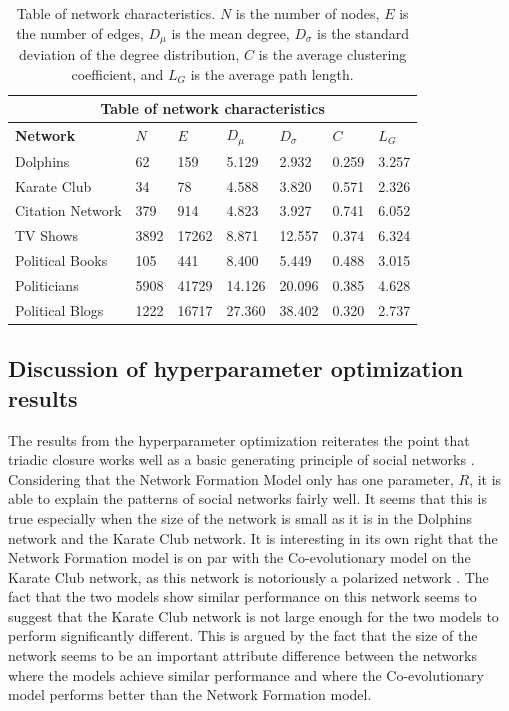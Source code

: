 \documentclass{article}
\begin{document}
\begin{table}[H]
    \begin{center}
        
    \begin{tabular}{ |p{3cm}||p{1.5cm}|p{1.5cm}|p{1.5cm}|p{1.5cm}|p{1.5cm}|p{1.5cm}|}
        \hline
        \multicolumn{7}{|c|}{Table of network characteristics} \\
        \hline
        \bf{Network} & $N$ & $E$ & $D_{\mu}$ & $D_{\sigma}$ & $C$ & $L_G$\\
        \hline
        Dolphins   & 62    &159&   5.129&   2.932 &   0.259 & 3.257\\
        Karate Club &34	&78	&4.588&	3.820&	0.571&	2.326\\
        Citation Network & 379 &	914	& 4.823	& 3.927 & 0.741 & 6.052 \\
        TV Shows & 3892 & 17262&8.871 & 12.557 & 0.374&6.324\\
        Political Books &105 &	441	& 8.400 &	5.449 &	0.488 &	3.015\\
        Politicians&  5908 &41729 & 14.126 & 20.096 &	0.385 & 4.628\\
        Political Blogs &	1222 & 16717 & 27.360 & 38.402 & 0.320 & 2.737\\
        \hline
    \end{tabular}
    \end{center}
    \caption{Table of network characteristics. $N$ is the number of nodes, $E$ is the number of edges, $D_{\mu}$ is the mean degree, $D_{\sigma}$ is the standard deviation of the degree distribution, $C$ is the average clustering coefficient, and $L_G$ is the average path length. }
    \label{table:characteristics}
    \end{table}

\subsection{Discussion of hyperparameter optimization results}
The results from the hyperparameter optimization reiterates the point that triadic closure works well as a basic generating principle of social networks \cite{jackson_meeting_2007,kossinets_origins_2009,bianconi_triadic_2014}. 
Considering that the Network Formation Model only has one parameter, $R$, it is able to explain the patterns of social networks fairly well. 
It seems that this is true especially when the size of the network is small as it is in the Dolphins network and the Karate Club network. 
It is interesting in its own right that the Network Formation model is on par with the Co-evolutionary model on the Karate Club network, as this network is notoriously a polarized network \cite{zachary_information_1977}. 
The fact that the two models show similar performance on this network seems to suggest that the Karate Club network is not large enough for the two models to perform significantly different. 
This is argued by the fact that the size of the network seems to be an important attribute difference between the networks where the models achieve similar performance and where the Co-evolutionary model performs better than the Network Formation model. 
\end{document}
